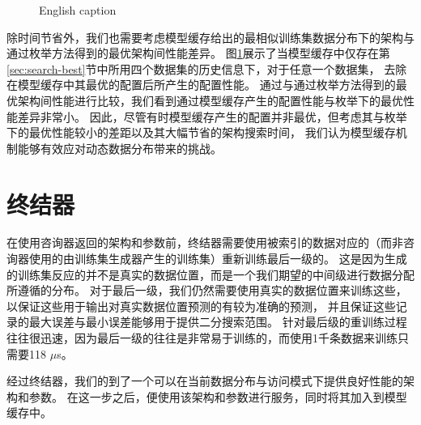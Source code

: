 \begin{figure}[!htp]
  \centering
    {English caption}
  \label{fig::counselor}
\end{figure}

除时间节省外，我们也需要考虑模型缓存给出的最相似训练集数据分布下的{\rmi}架构与通过枚举方法得到的最优{\rmi}架构间性能差异。
图\ref{fig::counselor}展示了当模型缓存中仅存在第\ref{sec:search-best}节中所用四个数据集的历史信息下，对于任意一个数据集，
去除在模型缓存中其最优的{\rmi}配置后所产生的配置性能。
通过与通过枚举方法得到的最优{\rmi}架构间性能进行比较，我们看到通过模型缓存产生的{\rmi}配置性能与枚举下的最优性能差异非常小。
因此，尽管有时模型缓存产生的{\rmi}配置并非最优，但考虑其与枚举下的最优性能较小的差距以及其大幅节省的架构搜索时间，
我们认为模型缓存机制能够有效应对动态数据分布带来的挑战。

\section{终结器}

在使用咨询器返回的{\rmi}架构和参数前，终结器需要使用被索引的数据对应的{\cdf}（而非咨询器使用的由训练集生成器产生的训练集）重新训练{\rmi}最后一级的{\model}。
这是因为生成的训练集反应的并不是真实的数据位置，而是一个我们期望的中间级{\model}进行数据分配所遵循的分布。
对于{\rmi}最后一级{\model}，我们仍然需要使用真实的数据位置来训练这些{\model}，以保证这些用于输出对真实数据位置预测的{\model}有较为准确的预测，
并且保证这些{\model}记录的最大误差与最小误差能够用于提供二分搜索范围。
针对{\rmi}最后级{\model}的重训练过程往往很迅速，因为最后一级的往往是非常易于训练的{\lr}，而使用1千条数据来训练{\lr}只需要118 $\mu$s。

经过终结器，我们的到了一个可以在当前数据分布与访问模式下提供良好性能的{\li}架构和参数。
在这一步之后，{\sys}便使用该{\li}架构和参数进行服务，同时将其加入到模型缓存中。


